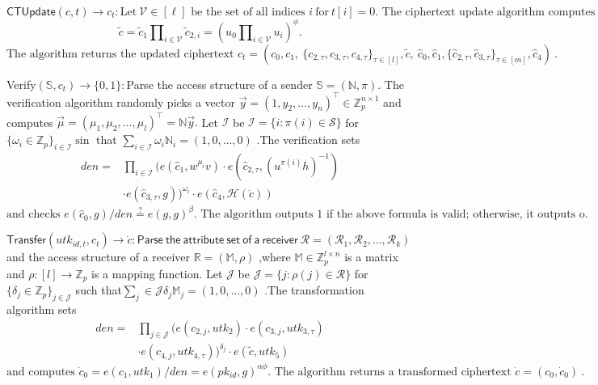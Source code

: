 \documentclass[runningheads]{llncs}
\begin{document}
$\mathsf{CTUpdate}(c,t)\to c_t:\mathrm{Let~}\mathcal{V}\in[\ell]\text{ be the set of all indices }i\mathrm{~for~}t[i]=0.\text{ The ciphertext update algorithm computes}$
\begin{equation*} \tilde {c}=\tilde {c}_{1}\prod \nolimits _{i\in \mathcal {V}}\tilde {c}_{2,i}=\left({u_{0}\prod \nolimits _{i\in \mathcal {V}}u_{i}}\right)^\phi.\end{equation*}
$\text{The algorithm returns the updated ciphertext }c_t=(c_0,c_1,\mathrm{~}\{c_{2,\tau},c_{3,\tau},c_{4,\tau}\}_{\tau\in[l]},\tilde{c},\mathrm{~}\hat{c}_0,\hat{c}_1,\{\hat{c}_{2,\tau},\hat{c}_{3,\tau}\}_{\tau\in[m]},\hat{c}_4)\mathrm{~.}$

Verify$(\mathbb{S},c_t)\to\{0,1\}:$Parse the access structure of a sender $\mathbb{S}=\left(\mathbb{N},\pi\right).$ The verification algorithm randomly picks a vector $\vec{y}=(1,y_2,\ldots,y_n)^\top\in\mathbb{Z}_p^{n\times1}$ and computes $\vec{\mu}=(\mu_1,\mu_2,\ldots,\mu_l)^\top=\mathbb{N}\vec{y}.$ Let $\mathcal{I}$ be $\mathcal{I}=\{i:\pi(i)\in\mathcal{S}\}$ for $\{\omega_i\in\mathbb{Z}_p\}_{i\in\mathcal{I}}\sin$ that $\sum_{i\in\mathcal{I}}\omega_i\mathbb{N}_i=(1,0,\ldots,0)$ .The verification sets
\begin{align*} den=&\prod \nolimits _{i\in \mathcal {I}}(e(\hat {c}_{1},w^{\mu _{i}}v)\cdot e(\hat {c}_{2,\tau },(u^{\pi (i)}h)^{-1})\\&\cdot e(\hat {c}_{3,\tau },g))^{\omega _{i}}\cdot e(\hat {c}_{4},\mathcal {H}(\ddot {c}))\end{align*}
$\text{and checks }e(\hat{c}_{0},g)/den\overset{?}{\operatorname*{\operatorname*{\operatorname*{=}}}}e(g,g)^{\beta}.\text{ The algorithm outputs 1 if the above formula is valid; otherwise, it outputs o.}$

$\mathsf{Transfer}(utk_{id,t},c_t)\to\dot{c}:\mathsf{Parse~the~attribute~set~of~a~receiver~}\mathcal{R}=(\mathcal{R}_1,\mathcal{R}_2,\ldots,\mathcal{R}_k)$ and the access structure of a receiver $\mathbb{R}=(\mathbb{M},\rho)$ ,where $\mathbb{M}\in\mathbb{Z}_p^{l\times n}$ is a matrix and $\rho:[l]\to\mathbb{Z}_p$ is a mapping function. Let $\mathcal{J}$ be $\mathcal{J}=\{j:\rho(j)\in\mathcal{R}\}$ for $\{\delta_j\in\mathbb{Z}_p\}_{j\in\mathcal{J}}$ such that$\sum_j\in\mathcal{J}\delta_j\mathbb{M}_j=(1,0,\ldots,0)$ .The transformation algorithm sets
\begin{align*} den=&\prod \nolimits _{j\in \mathcal {J}}(e(c_{2,j},utk_{2})\cdot e(c_{3,j},utk_{3,\tau })\\&\cdot e(c_{4,j},utk_{4,\tau }))^{\delta _{j}}\cdot e(\tilde {c},utk_{5})\end{align*}
$\text{and computes }\dot{c}_0=e(c_1,utk_1)/den=e(pk_{id},g)^{\alpha\phi}.\text{ The algorithm returns a transformed ciphertext }\dot{c}=(c_0,\dot{c}_0)\mathrm{~.}$
\end{document}
